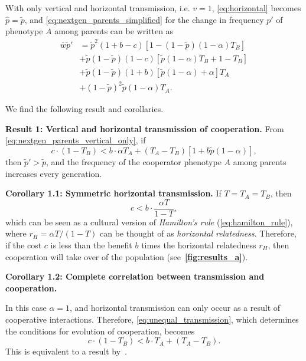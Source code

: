 \documentclass[12pt]{extarticle}
\begin{document}
With only vertical and horizontal transmission, i.e. $v=1$, \autoref{eq:horizontal} becomes
$\hat{p} =  \tilde{p}$,
and \autoref{eq:nextgen_parents_simplified} for the change in frequency $p'$ of phenotype $A$ among parents can be written as
\begin{equation} \label{eq:nextgen_parents_vertical_only} 
\begin{aligned}
\bar{w} \tilde{p}' 
& = \tilde{p}^2 (1+b-c) [1 - (1-\tilde{p}) (1-\alpha) T_B] \\
& + \tilde{p}(1-\tilde{p}) (1-c) [\tilde{p} (1-\alpha) T_B + 1 - T_B] \\
& + \tilde{p}(1-\tilde{p}) (1+b) [\tilde{p} (1-\alpha) + \alpha] T_A \\
& + (1-\tilde{p})^2 \tilde{p} (1-\alpha) T_A .
\end{aligned}
\end{equation}

We find the following result and corollaries.

\textbf{Result 1: Vertical and horizontal transmission of cooperation.}
From \autoref{eq:nextgen_parents_vertical_only}, if
\begin{equation} \label{eq:unequal_transmission}
c \cdot (1-T_B) < b \cdot  \alpha T_A  + (T_A - T_B) [1 + b\tilde{p}(1-\alpha)] ,
\end{equation}
then $\tilde{p}' > \tilde{p}$, and the frequency of the cooperator phenotype $A$ among parents increases every generation.

\textbf{Corollary 1.1: Symmetric horizontal transmission.}
If $T=T_A=T_B$, then
\begin{equation}
\label{eq:equal_transmission}
c < b \cdot \frac{\alpha T}{1-T},
\end{equation}
which can be seen as a cultural version of \emph{Hamilton's rule} (\autoref{eq:hamilton_rule}), where $r_H=\alpha T/(1-T)$ can be thought of as \emph{horizontal relatedness}.
Therefore, if the cost $c$ is less than the benefit $b$ times the horizontal relatedness $r_H$, then cooperation will take over of the population (see~\textbf{\autoref{fig:results_a}}).

\textbf{Corollary 1.2: Complete correlation between transmission and cooperation.}
	
In this case $\alpha=1$, and horizontal transmission can only occur as a result of cooperative interactions.
Therefore, \autoref{eq:unequal_transmission}, which determines the conditions for evolution of cooperation, becomes
\begin{equation}\label{eq:horizontal_transmission_only_after_interaction}
c \cdot (1-T_B) < b \cdot T_A + (T_A - T_B).
\end{equation}
This is equivalent to a result by~\citet[eq.~1]{lewin2017microbes}.
\end{document}
